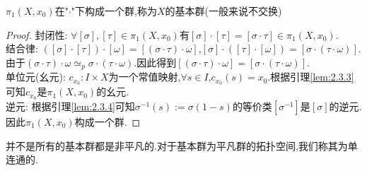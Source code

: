 \documentclass{article}
\begin{document}
\begin{theorem}
    $\pi_1(X,x_0)$在"$\cdot$"下构成一个群,称为$X$的基本群(一般来说不交换)
\end{theorem}
\begin{proof}
    封闭性: $\forall [\sigma],[\tau] \in \pi_1(X,x_0)$有$[\sigma]\cdot [\tau] = [\sigma \cdot \tau] \in \pi_1(X,x_0)$.\\
    结合律: $([\sigma]\cdot [\tau])\cdot [\omega] = [(\sigma \cdot \tau)\cdot \omega]$,$[\sigma]\cdot([\tau]\cdot [\omega]) = [\sigma \cdot (\tau \cdot \omega)]$.由于$(\sigma \cdot \tau)\cdot \omega \simeq_p \sigma\cdot(\tau \cdot \omega)$.因此得到$[(\sigma \cdot \tau)\cdot \omega] =[\sigma \cdot (\tau \cdot \omega)]$.\\
    单位元(幺元):  $c_{x_0} : I \times X$为一个常值映射,$\forall s \in I$,$c_{x_0}(s) = x_0$.根据引理\ref{lem:2.3.3}可知$c_{x_0}$是$\pi_1(X,x_0)$的幺元.\\
    逆元: 根据引理\ref{lem:2.3.4}可知$\sigma^{-1}(s) := \sigma(1-s)$的等价类$[\sigma^{-1}]$是$[\sigma]$的逆元.\\
    因此$\pi_1(X,x_0)$构成一个群.
\end{proof}
并不是所有的基本群都是非平凡的.对于基本群为平凡群的拓扑空间,我们称其为单连通的.
\end{document}
